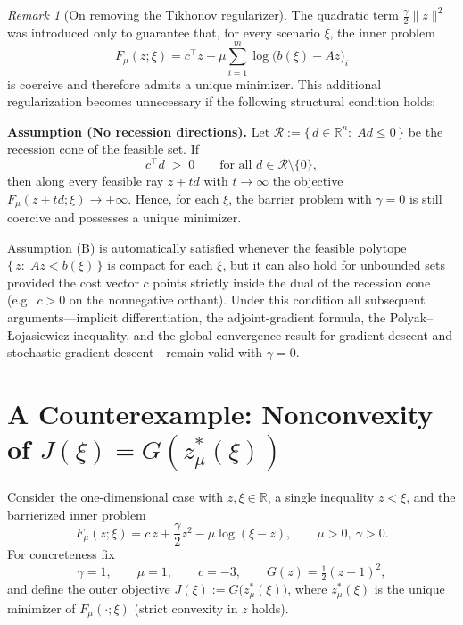 \documentclass[11pt]{article}
\theoremstyle{remark}
\newtheorem{remark}{Remark}
\begin{document}
\begin{remark}[On removing the Tikhonov regularizer]
\label{rem:no_tikhonov}
The quadratic term $\tfrac{\gamma}{2}\|z\|^2$ was introduced only to guarantee that, 
for every scenario $\xi$, the inner problem
\begin{equation*}
F_\mu(z;\xi)=c^\top z-\mu\!\sum_{i=1}^m \log\big(b(\xi)-A z\big)_i
\end{equation*}
is coercive and therefore admits a unique minimizer.  
This additional regularization becomes unnecessary if the following structural condition holds:

\medskip
\noindent\textbf{Assumption (No recession directions).}
Let $\mathcal R:=\{\,d\in\mathbb{R}^n:\;A d\le 0\,\}$ be the recession cone of the feasible set.
If
\begin{equation*}
c^\top d \;>\; 0 \qquad \text{for all } d\in \mathcal R\setminus\{0\},
\end{equation*}
then along every feasible ray $z+t d$ with $t\to\infty$ the objective
$F_\mu(z+t d;\xi)\to +\infty$.
Hence, for each $\xi$, the barrier problem with $\gamma=0$ is still coercive and possesses a unique minimizer.

\medskip
\noindent
Assumption (B) is automatically satisfied whenever the feasible polytope 
$\{\,z:\;A z<b(\xi)\,\}$ is compact for each $\xi$, 
but it can also hold for unbounded sets provided the cost vector $c$
points strictly inside the dual of the recession cone (e.g.\ $c>0$ on the nonnegative orthant).  
Under this condition all subsequent arguments---implicit differentiation,
the adjoint-gradient formula, the Polyak–Łojasiewicz inequality, and the global-convergence
result for gradient descent and stochastic gradient descent---remain valid
with $\gamma=0$.
\end{remark}

\section{A Counterexample: Nonconvexity of $J(\xi)=G(z_\mu^*(\xi))$}
Consider the one-dimensional case with $z,\xi\in\mathbb{R}$, a single inequality $z<\xi$, and the barrierized inner problem
\begin{equation*}
F_\mu(z;\xi)=c\,z+\frac{\gamma}{2}z^2-\mu\log(\xi-z),\qquad \mu>0,\ \gamma>0.
\end{equation*}
For concreteness fix
\begin{equation*}
\gamma=1,\qquad \mu=1,\qquad c=-3,\qquad G(z)=\tfrac12(z-1)^2,
\end{equation*}
and define the outer objective $J(\xi):=G\big(z_\mu^*(\xi)\big)$, where $z_\mu^*(\xi)$ is the unique minimizer of $F_\mu(\cdot;\xi)$ (strict convexity in $z$ holds).
\end{document}
